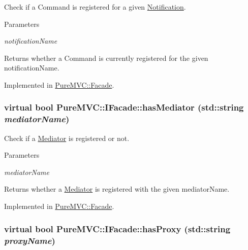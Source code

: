 Check if a Command is registered for a given \hyperlink{class_pure_m_v_c_1_1_notification}{Notification}. 
\begin{DoxyParams}{Parameters}
\item[{\em notificationName}]\end{DoxyParams}
\begin{DoxyReturn}{Returns}
whether a Command is currently registered for the given {\ttfamily notificationName}. 
\end{DoxyReturn}


Implemented in \hyperlink{class_pure_m_v_c_1_1_facade_aee8eb006e9e5b894226558938ba807ae}{PureMVC::Facade}.\hypertarget{class_pure_m_v_c_1_1_i_facade_ab41b21fd725b18863d9ac8ada92984ce}{
\subsubsection[{hasMediator}]{\setlength{\rightskip}{0pt plus 5cm}virtual bool PureMVC::IFacade::hasMediator (std::string {\em mediatorName})}}
\label{class_pure_m_v_c_1_1_i_facade_ab41b21fd725b18863d9ac8ada92984ce}


Check if a \hyperlink{class_pure_m_v_c_1_1_mediator}{Mediator} is registered or not. 
\begin{DoxyParams}{Parameters}
\item[{\em mediatorName}]\end{DoxyParams}
\begin{DoxyReturn}{Returns}
whether a \hyperlink{class_pure_m_v_c_1_1_mediator}{Mediator} is registered with the given {\ttfamily mediatorName}. 
\end{DoxyReturn}


Implemented in \hyperlink{class_pure_m_v_c_1_1_facade_a214c067f65fabe53634541f531b41609}{PureMVC::Facade}.\hypertarget{class_pure_m_v_c_1_1_i_facade_a61b5a6f7c6d25c791b274093235f5c52}{
\subsubsection[{hasProxy}]{\setlength{\rightskip}{0pt plus 5cm}virtual bool PureMVC::IFacade::hasProxy (std::string {\em proxyName})}}
\label{class_pure_m_v_c_1_1_i_facade_a61b5a6f7c6d25c791b274093235f5c52}


